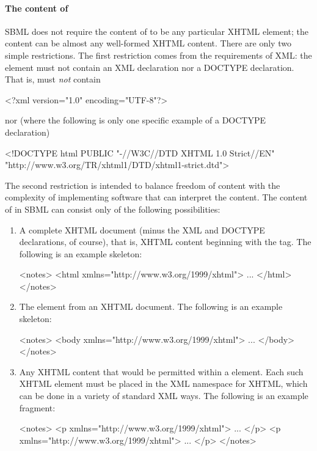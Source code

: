 \paragraph{The content of }

SBML does not require the content of  to be any
particular XHTML element; the content can be almost any
well-formed XHTML content.  There are only two simple
restrictions.  The first restriction comes from the requirements
of XML: the  element must not contain an XML
declaration nor a DOCTYPE declaration.  That is, 
must \emph{not} contain

\begin{example}
<?xml version="1.0" encoding="UTF-8"?>  
\end{example}

nor (where the following is only one specific example of a
DOCTYPE declaration)

\begin{example}
<!DOCTYPE html PUBLIC "-//W3C//DTD XHTML 1.0 Strict//EN"
 "http://www.w3.org/TR/xhtml1/DTD/xhtml1-strict.dtd">
\end{example}

The second restriction is intended to balance freedom of content
with the complexity of implementing software that can interpret
the content.  The content of  in SBML can consist
only of the following possibilities:
\begin{enumerate}
  
\item A complete XHTML document (minus the XML and DOCTYPE
  declarations, of course), that is, XHTML content beginning with
  the  tag.  The following is an example skeleton:
  \begin{example}
<notes>
    <html xmlns="http://www.w3.org/1999/xhtml">
      ...
    </html>
</notes>\end{example}

\item The  element from an XHTML document.  The
  following is an example skeleton:
  \begin{example}
<notes>
    <body xmlns="http://www.w3.org/1999/xhtml">
      ...
    </body>
</notes>\end{example}
  
\item Any XHTML content that would be permitted within a
   element.  Each such XHTML element must be placed in
  the XML namespace for XHTML, which can be done in a variety of
  standard XML ways.  The following is an example fragment:
  \begin{example}
<notes>
    <p xmlns="http://www.w3.org/1999/xhtml">
      ...
    </p>
    <p xmlns="http://www.w3.org/1999/xhtml">
      ...
    </p>
</notes>\end{example}

\end{enumerate}

